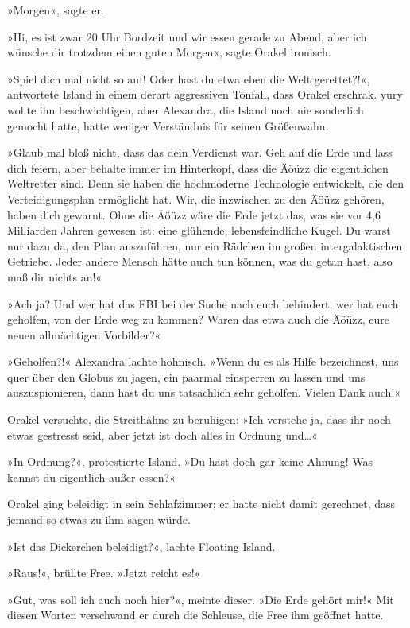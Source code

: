 »Morgen«, sagte er.

»Hi, es ist zwar 20 Uhr Bordzeit und wir essen gerade zu Abend, aber ich wünsche dir trotzdem einen guten Morgen«, sagte Orakel ironisch.

»Spiel dich mal nicht so auf! Oder hast du etwa eben die Welt gerettet?!«, antwortete Island in einem derart aggressiven Tonfall, dass Orakel erschrak. yury wollte ihn beschwichtigen, aber Alexandra, die Island noch nie sonderlich gemocht hatte, hatte weniger Verständnis für seinen Größenwahn.

»Glaub mal bloß nicht, dass das dein Verdienst war. Geh auf die Erde und lass dich feiern, aber behalte immer im Hinterkopf, dass die Äöüzz die eigentlichen Weltretter sind. Denn sie haben die hochmoderne Technologie entwickelt, die den Verteidigungsplan ermöglicht hat. Wir, die inzwischen zu den Äöüzz gehören, haben dich gewarnt. Ohne die Äöüzz wäre die Erde jetzt das, was sie vor 4,6 Milliarden Jahren gewesen ist: eine glühende, lebensfeindliche Kugel. Du warst nur dazu da, den Plan auszuführen, nur ein Rädchen im großen intergalaktischen Getriebe. Jeder andere Mensch hätte auch tun können, was du getan hast, also maß dir nichts an!«

»Ach ja? Und wer hat das FBI bei der Suche nach euch behindert, wer hat euch geholfen, von der Erde weg zu kommen? Waren das etwa auch die Äöüzz, eure neuen allmächtigen Vorbilder?«

»Geholfen?!« Alexandra lachte höhnisch. »Wenn du es als Hilfe bezeichnest, uns quer über den Globus zu jagen, ein paarmal einsperren zu lassen und uns auszuspionieren, dann hast du uns tatsächlich sehr geholfen. Vielen Dank auch!«

Orakel versuchte, die Streithähne zu beruhigen: »Ich verstehe ja, dass ihr noch etwas gestresst seid, aber jetzt ist doch alles in Ordnung und…«

»In Ordnung?«, protestierte Island. »Du hast doch gar keine Ahnung! Was kannst du eigentlich außer essen?«

Orakel ging beleidigt in sein Schlafzimmer; er hatte nicht damit gerechnet, dass jemand so etwas zu ihm sagen würde.

»Ist das Dickerchen beleidigt?«, lachte Floating Island.

»Raus!«, brüllte Free. »Jetzt reicht es!«

»Gut, was soll ich auch noch hier?«, meinte dieser. »Die Erde gehört mir!« Mit diesen Worten verschwand er durch die Schleuse, die Free ihm geöffnet hatte.

